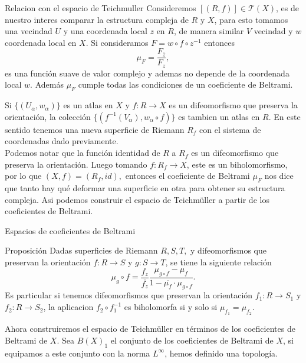 \documentclass[xcolor=dvipsnames,10pt]{beamer}
\begin{document}
\begin{frame}{Relacion con el espacio de Teichmuller}
    Consideremos $[(R,f)]\in\mathcal{T}(X)$, es de nuestro interes comparar la estructura compleja de $R$ y $X$, para esto tomamos una vecindad $U$ y una coordenada local $z$ en $R$, de manera similar $V$ vecindad y $w$ coordenada local en $X.$ Si consideramos $F=w\circ f\circ z^{-1}$ entonces 
    $$\mu_F=\frac{F_{\overline{z}}}{F_z},$$
    es una función suave de valor complejo y ademas no depende de la coordenada local $w.$ Además $\mu_F$ cumple todas las condiciones de un coeficiente de Beltrami.
\end{frame}
\begin{frame}
    Si $\{(U_\alpha,w_\alpha)\}$ es un atlas en $X$ y $f:R\rightarrow X$ es un difeomorfismo que preserva la orientación, la colección $\{(f^{-1}(V_\alpha),w_\alpha \circ f)\}$ es tambien un atlas en $R$. En este sentido tenemos una nueva superficie de Riemann $R_f$ con el sistema de coordenadas dado previamente.\\
    \vspace{0.3cm}
    Podemos notar que la función identidad de $R$ a $R_f$ es un difeomorfismo que preserva la orientación. Luego tomando $f:R_f\to X$, este es un biholomorfismo, por lo que $(X,f)=(R_f,id),$ entonces el coeficiente de Beltrami $\mu_F$ nos dice que tanto hay qué deformar una superficie en otra para obtener su estructura compleja. Asi podemos construir el espacio de Teichmüller a partir de los coeficientes de Beltrami.
\end{frame}
\begin{frame}{Espacios de coeficientes de Beltrami}

    \begin{block}{Proposición}
        Dadas superficies de Riemann $R,S,T,$ y difeomorfismos que preservan la orientación $f:R\to S$ y $g:S\to T$, se tiene la siguiente relación
        $$\mu_g\circ f=\frac{f_z}{\overline{f_z}}\frac{\mu_{g\circ f}-\mu_f}{1-\overline{\mu_f}\cdot\mu_{g\circ f}}.$$ 
        Es particular si tenemos difeomorfismos que preservan la orientación $f_1:R\to S_1$ y $f_2:R\to S_2$, la aplicacion $f_2\circ f_1^{-1}$ es biholomorfa si y solo si $\mu_{f_1}=\mu_{f_2}.$
    \end{block}
    Ahora construiremos el espacio de Teichmüller en términos de los coeficientes de Beltrami de $X.$ Sea $B(X)_1$ el conjunto de los coeficientes de Beltrami de $X$, si equipamos a este conjunto con la norma $L^\infty$, hemos definido una topología. 
\end{frame}
\end{document}
